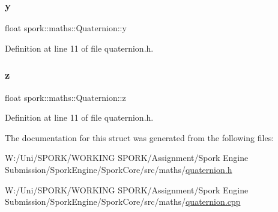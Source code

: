 \subsubsection{\texorpdfstring{y}{y}}
{\footnotesize\ttfamily float spork\+::maths\+::\+Quaternion\+::y}



Definition at line 11 of file quaternion.\+h.

\mbox{\label{structspork_1_1maths_1_1_quaternion_a34c6708dbdf1e1e537d034fdab001584}} 
\subsubsection{\texorpdfstring{z}{z}}
{\footnotesize\ttfamily float spork\+::maths\+::\+Quaternion\+::z}



Definition at line 11 of file quaternion.\+h.



The documentation for this struct was generated from the following files\+:\begin{DoxyCompactItemize}
\item 
W\+:/\+Uni/\+S\+P\+O\+R\+K/\+W\+O\+R\+K\+I\+N\+G S\+P\+O\+R\+K/\+Assignment/\+Spork Engine Submission/\+Spork\+Engine/\+Spork\+Core/src/maths/\hyperlink{quaternion_8h}{quaternion.\+h}\item 
W\+:/\+Uni/\+S\+P\+O\+R\+K/\+W\+O\+R\+K\+I\+N\+G S\+P\+O\+R\+K/\+Assignment/\+Spork Engine Submission/\+Spork\+Engine/\+Spork\+Core/src/maths/\hyperlink{quaternion_8cpp}{quaternion.\+cpp}\end{DoxyCompactItemize}
